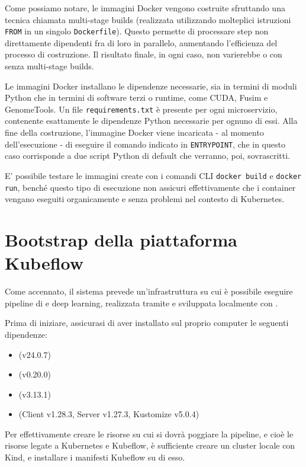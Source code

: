 Come possiamo notare, le immagini Docker vengono costruite sfruttando una tecnica chiamata multi-stage builds (realizzata utilizzando molteplici istruzioni {\small \verb|FROM|} in un singolo {\small \verb|Dockerfile|}). Questo permette di processare step non direttamente dipendenti fra di loro in parallelo, aumentando l'efficienza del processo di costruzione. Il risultato finale, in ogni caso, non varierebbe o con senza multi-stage builds.

Le immagini Docker installano le dipendenze necessarie, sia in termini di moduli Python che in termini di software terzi o runtime, come CUDA, Fusim e GenomeTools. Un file {\small \verb|requirements.txt|} è presente per ogni microservizio, contenente esattamente le dipendenze Python necessarie per ognuno di essi. Alla fine della costruzione, l'immagine Docker viene incaricata - al momento dell'esecuzione - di eseguire il comando indicato in {\small \verb|ENTRYPOINT|}, che in questo caso corrisponde a due script Python di default che verranno, poi, sovrascritti.

E' possibile testare le immagini create con i comandi CLI {\small \verb|docker build|} e {\small \verb|docker run|}, benché questo tipo di esecuzione non assicuri effettivamente che i container vengano eseguiti organicamente e senza problemi nel contesto di Kubernetes.

\section{Bootstrap della piattaforma Kubeflow}

Come accennato, il sistema prevede un'infrastruttura  su cui è possibile eseguire pipeline di  e deep learning, realizzata tramite  e sviluppata localmente con .

Prima di iniziare, assicurasi di aver installato sul proprio computer le seguenti dipendenze:

\begin{itemize}
    \item {} (v24.0.7)
    \item {} (v0.20.0)
    \item {} (v3.13.1)
    \item {} (Client v1.28.3, Server v1.27.3, Kustomize v5.0.4)
\end{itemize}

Per effettivamente creare le risorse su cui si dovrà poggiare la pipeline, e cioè le risorse legate a Kubernetes e Kubeflow, è sufficiente creare un cluster locale con Kind, e installare i manifesti Kubeflow su di esso.

